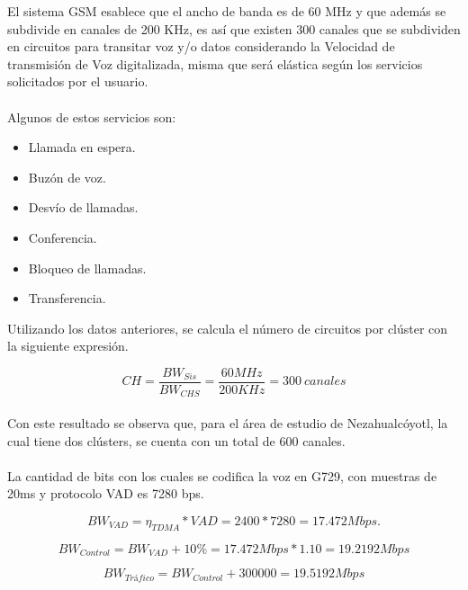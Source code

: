 \documentclass[11pt,letterpaper]{article}
\begin{document}
El sistema GSM esablece que el ancho de banda es de 60 MHz y que además se subdivide en 
canales de 200 KHz, es así que existen 300 canales que se subdividen en circuitos para 
transitar voz y/o datos considerando la Velocidad de transmisión de Voz digitalizada, 
misma que será elástica según los servicios solicitados por el usuario.
\\ \\
Algunos de estos servicios son:
\begin{itemize}
    \item Llamada en espera.
    \item Buzón de voz.
    \item Desvío de llamadas.
    \item Conferencia.
    \item Bloqueo de llamadas.
    \item Transferencia.
\end{itemize}


\newpage
Utilizando los datos anteriores, se calcula el número de circuitos por clúster con la 
siguiente expresión.

\begin{equation}
    CH=\frac{BW_{Sis}}{BW_{CHS}}=\frac{60MHz}{200KHz}=300 \ canales
\end{equation}
\\
Con este resultado se observa que, para el área de estudio de Nezahualcóyotl, la cual tiene dos 
clústers, se cuenta con un total de 600 canales.
\\ \\
La cantidad de bits con los cuales se codifica la voz en G729, con muestras de 20ms y 
protocolo VAD es 7280 bps.

\begin{equation}
    BW_{VAD}=\eta_{TDMA}*VAD=2400*7280=17.472Mbps.
\end{equation}

\begin{equation}
    BW_{Control}=BW_{VAD}+10\%=17.472Mbps*1.10=19.2192Mbps
\end{equation}

\begin{equation}
    BW_{Tráfico}=BW_{Control}+300000=19.5192Mbps
\end{equation}
\end{document}
